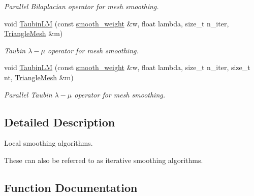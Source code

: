 \begin{DoxyCompactItemize}
\begin{DoxyCompactList}\small\item\em Parallel Bilaplacian operator for mesh smoothing. \end{DoxyCompactList}\item 
void \hyperlink{namespacegeoproc_1_1smoothing_1_1local_acb46f51bf5fefe33b36ae6d7e0c4a899}{Taubin\+LM} (const \hyperlink{namespacegeoproc_1_1smoothing_a76e43f405426c150569712512de58028}{smooth\+\_\+weight} \&w, float lambda, size\+\_\+t n\+\_\+iter, \hyperlink{classgeoproc_1_1TriangleMesh}{Triangle\+Mesh} \&m)
\begin{DoxyCompactList}\small\item\em Taubin $\lambda-\mu$ operator for mesh smoothing. \end{DoxyCompactList}\item 
void \hyperlink{namespacegeoproc_1_1smoothing_1_1local_ae68c255cdba405972ce42238aee04c3b}{Taubin\+LM} (const \hyperlink{namespacegeoproc_1_1smoothing_a76e43f405426c150569712512de58028}{smooth\+\_\+weight} \&w, float lambda, size\+\_\+t n\+\_\+iter, size\+\_\+t nt, \hyperlink{classgeoproc_1_1TriangleMesh}{Triangle\+Mesh} \&m)
\begin{DoxyCompactList}\small\item\em Parallel Taubin $\lambda-\mu$ operator for mesh smoothing. \end{DoxyCompactList}\end{DoxyCompactItemize}


\subsection{Detailed Description}
Local smoothing algorithms. 

These can also be referred to as iterative smoothing algorithms. 

\subsection{Function Documentation}
\mbox{\label{namespacegeoproc_1_1smoothing_1_1local_a5958a9bdf688836bd6242de213a68ec4}} 
